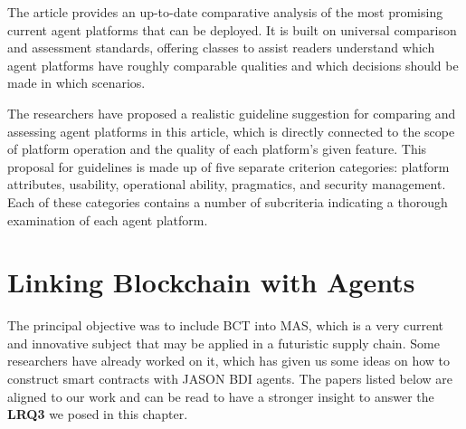 \begin{itemize}[label={}]
The article \cite{survey} provides an up-to-date comparative analysis of the most promising current agent platforms that can be deployed. It is built on universal comparison and assessment standards, offering classes to assist readers understand which agent platforms have roughly comparable qualities and which decisions should be made in which scenarios.

\vspace{.5cm}

The researchers have proposed a realistic guideline suggestion for comparing and assessing agent platforms in this article, which is directly connected to the scope of platform operation and the quality of each platform's given feature. This proposal for guidelines is made up of five separate criterion categories: platform attributes, usability, operational ability, pragmatics, and security management. Each of these categories contains a number of subcriteria indicating a thorough examination of each agent platform.

\end{itemize}


\section{Linking Blockchain with Agents}

The principal objective was to include \ac{BCT} into \ac{MAS}, which is a very current and innovative subject that may be applied in a futuristic supply chain. Some researchers have already worked on it, which has given us some ideas on how to construct smart contracts with JASON \ac{BDI} agents. The papers listed below are aligned to our work and can be read to have a stronger insight to answer the \textbf{LRQ3} we posed in this chapter.

